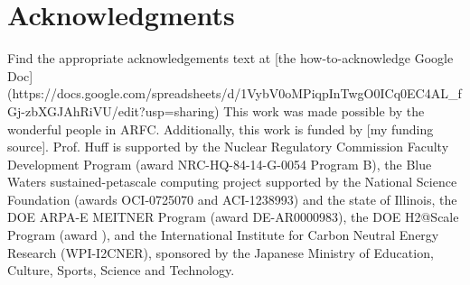 \section{Acknowledgments}
Find the appropriate acknowledgements text at 
[the how-to-acknowledge Google Doc](https://docs.google.com/spreadsheets/d/1VybV0oMPiqpInTwgO0ICq0EC4AL_fGj-zbXGJAhRiVU/edit?usp=sharing)
This work was made possible by the wonderful people in ARFC. Additionally,
this work is funded by [my funding source].
Prof. Huff is supported by the Nuclear Regulatory Commission Faculty
Development Program (award NRC-HQ-84-14-G-0054 Program B), the Blue Waters
sustained-petascale computing project supported by the National Science
Foundation (awards OCI-0725070 and ACI-1238993) and the state of Illinois,
the DOE ARPA-E MEITNER Program (award DE-AR0000983), the DOE H2@Scale
Program (award ), and the International Institute for Carbon Neutral Energy
Research (WPI-I2CNER), sponsored by the Japanese Ministry of Education,
Culture, Sports, Science and Technology.
